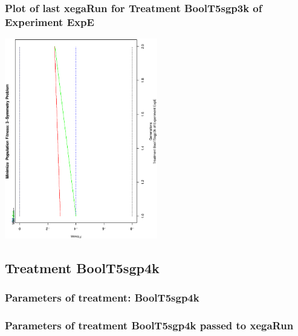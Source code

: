 \documentclass[18pt,c]{beamer}
\makeatletter
\def\beamer@writeslidentry@miniframesoff{%
  \expandafter\beamer@ifempty\expandafter{\beamer@framestartpage}{}%
  {%
   \clearpage\beamer@notesactions%
  }
}
\newcommand*{\miniframesoff}{\let\beamer@writeslidentry=\beamer@writeslidentry@miniframesoff}
\makeatother
\begin{document}
 \begin{frame}
 \frametitle{ Plot of last xegaRun for Treatment BoolT5sgp3k of Experiment ExpE }
 \begin{center}
\includegraphics[width=0.5\textwidth, angle=-90]
{ExpEPlotPopStatsFigure006.eps}
 \end{center}
 \label{report/ExpEPlotPopStatsFigure006.eps}  
 \end{frame}

\miniframesoff
\subsection{Treatment BoolT5sgp4k}

 \begin{frame}
 \fontsize{8pt}{9pt}\selectfont
 \frametitle{  Parameters of treatment: BoolT5sgp4k 
 }

 \label{ExpEtParmTable028.tex}  
 \end{frame}


 \begin{frame}
 \fontsize{8pt}{9pt}\selectfont
 \frametitle{  Parameters of treatment BoolT5sgp4k passed to xegaRun
 }

 \label{ExpEtParmTable029.tex}  
 \end{frame}
\end{document}
